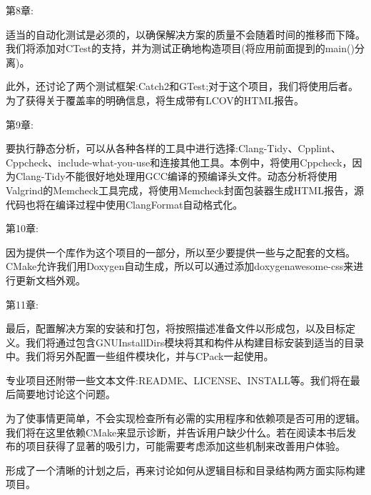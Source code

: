 第8章:

适当的自动化测试是必须的，以确保解决方案的质量不会随着时间的推移而下降。我们将添加对CTest的支持，并为测试正确地构造项目(将应用前面提到的main()分离)。

此外，还讨论了两个测试框架:Catch2和GTest;对于这个项目，我们将使用后者。为了获得关于覆盖率的明确信息，将生成带有LCOV的HTML报告。

第9章:

要执行静态分析，可以从各种各样的工具中进行选择:Clang-Tidy、Cpplint、Cppcheck、include-what-you-use和连接其他工具。本例中，将使用Cppcheck，因为Clang-Tidy不能很好地处理用GCC编译的预编译头文件。动态分析将使用Valgrind的Memcheck工具完成，将使用Memcheck封面包装器生成HTML报告，源代码也将在编译过程中使用ClangFormat自动格式化。

第10章:

因为提供一个库作为这个项目的一部分，所以至少要提供一些与之配套的文档。CMake允许我们用Doxygen自动生成，所以可以通过添加doxygenawesome-css来进行更新文档外观。

第11章:

最后，配置解决方案的安装和打包，将按照描述准备文件以形成包，以及目标定义。我们将通过包含GNUInstallDirs模块将其和构件从构建目标安装到适当的目录中。我们将另外配置一些组件模块化，并与CPack一起使用。

专业项目还附带一些文本文件:README、LICENSE、INSTALL等。我们将在最后简要地讨论这个问题。

\begin{tcolorbox}[colback=blue!5!white,colframe=blue!75!black,title=Note]
为了使事情更简单，不会实现检查所有必需的实用程序和依赖项是否可用的逻辑。我们将在这里依赖CMake来显示诊断，并告诉用户缺少什么。若在阅读本书后发布的项目获得了显著的吸引力，可能需要考虑添加这些机制来改善用户体验。
\end{tcolorbox}

形成了一个清晰的计划之后，再来讨论如何从逻辑目标和目录结构两方面实际构建项目。
















